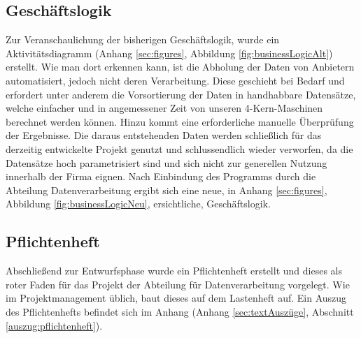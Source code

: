 \subsection{Geschäftslogik}
Zur Veranschaulichung der bisherigen Geschäftslogik, wurde ein Aktivitätsdiagramm (Anhang \ref{sec:figures}, Abbildung \ref{fig:businessLogicAlt})
erstellt. Wie man dort erkennen kann, ist die Abholung der Daten von Anbietern automatisiert, jedoch nicht deren Verarbeitung.
Diese geschieht bei Bedarf und erfordert unter anderem die Vorsortierung der Daten
in handhabbare Datensätze, welche einfacher und in angemessener Zeit von unseren 4-Kern-Maschinen
berechnet werden können. Hinzu kommt eine erforderliche manuelle Überprüfung
der Ergebnisse. Die daraus entstehenden Daten werden schließlich für das derzeitig entwickelte Projekt
genutzt und schlussendlich wieder verworfen, da die Datensätze hoch parametrisiert
sind und sich nicht zur generellen Nutzung innerhalb der Firma eignen. Nach
Einbindung des Programms durch die Abteilung Datenverarbeitung ergibt sich eine
neue, in Anhang \ref{sec:figures}, Abbildung \ref{fig:businessLogicNeu}, ersichtliche, Geschäftslogik.\par



\subsection{Pflichtenheft}
Abschließend zur Entwurfsphase wurde ein Pflichtenheft erstellt und dieses als
roter Faden für das Projekt der Abteilung für Datenverarbeitung vorgelegt. Wie im
Projektmanagement üblich, baut dieses auf dem Lastenheft auf.
Ein Auszug des Pflichtenhefts befindet sich im Anhang (Anhang \ref{sec:textAuszüge}, Abschnitt \ref{auszug:pflichtenheft}).
